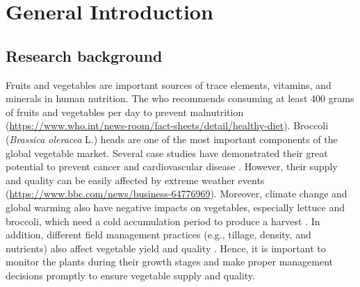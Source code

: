 \chapter{General Introduction}

\section{Research background}


Fruits and vegetables are important sources of trace elements, vitamins, and minerals in human nutrition. The \gls{who} recommends consuming at least 400 grams of fruits and vegetables per day to prevent malnutrition (\url{https://www.who.int/news-room/fact-sheets/detail/healthy-diet}). Broccoli (\textit{Brassica oleracea} L.) heads are one of the most important components of the global vegetable market. Several case studies have demonstrated their great potential to prevent cancer and cardiovascular disease \citep{mahn_overview_2012,latte_health_2011}. However, their supply and quality can be easily affected by extreme weather events (\url{https://www.bbc.com/news/business-64776969}). Moreover, climate change and global warming also have negative impacts on vegetables, especially lettuce and broccoli, which need a cold accumulation period to produce a harvest \citep{bisbis_potential_2018}. In addition, different field management practices (e.g., tillage, density, and nutrients) also affect vegetable yield and quality \citep{jackson_onfarm_2004, satodiya_effect_2015}. Hence, it is important to monitor the plants during their growth stages and make proper management decisions promptly to ensure vegetable supply and quality.

